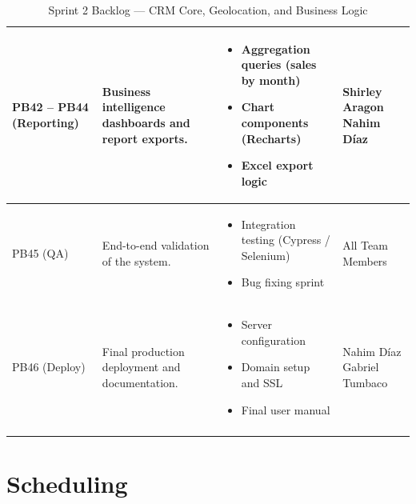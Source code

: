 \documentclass[letterpaper%
, oneside%
, 12pt%
, memoireprojet%
, english%
,creativecommons,hyperref, withAlgo2e %
]{thETS}
\begin{document}
\begin{longtable}{|
p{3.0cm}|
p{4.6cm}|
p{5.6cm}|
p{3.0cm}|
}
PB42 -- PB44 (Reporting) &
Business intelligence dashboards and report exports. &
\begin{itemize}\setlength{\itemsep}{2pt}
\item Aggregation queries (sales by month)
\item Chart components (Recharts)
\item Excel export logic
\end{itemize} &
Shirley Aragon \newline
Nahim Díaz \\ \hline

PB45 (QA) &
End-to-end validation of the system. &
\begin{itemize}\setlength{\itemsep}{2pt}
\item Integration testing (Cypress / Selenium)
\item Bug fixing sprint
\end{itemize} &
All Team Members \\ \hline

PB46 (Deploy) &
Final production deployment and documentation. &
\begin{itemize}\setlength{\itemsep}{2pt}
\item Server configuration
\item Domain setup and SSL
\item Final user manual
\end{itemize} &
Nahim Díaz \newline
Gabriel Tumbaco \\ \hline

\caption{Sprint 2 Backlog — CRM Core, Geolocation, and Business Logic}
\end{longtable}

\endgroup

\clearpage
\section{Scheduling}

\begingroup
\setlength{\LTleft}{-1.2cm plus -1fill}
\setlength{\LTright}{\LTleft}
\setlength{\LTcapwidth}{\textwidth}
\end{document}
